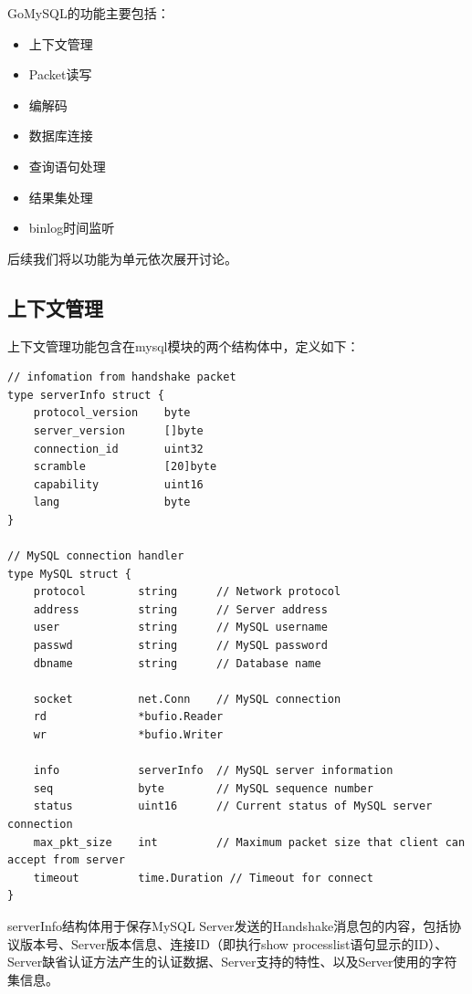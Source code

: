 \documentclass[a4paper, titlepage, 10pt, bookmark]{article}
\begin{document}
GoMySQL的功能主要包括：
\begin{itemize}
    \item 上下文管理
    \item Packet读写
    \item 编解码
    \item 数据库连接
    \item 查询语句处理
    \item 结果集处理
    \item binlog时间监听
\end{itemize}

后续我们将以功能为单元依次展开讨论。



\subsection{上下文管理}
上下文管理功能包含在mysql模块的两个结构体中，定义如下：
\begin{spacing}{1.0}
\begin{lstlisting}
// infomation from handshake packet
type serverInfo struct {
    protocol_version    byte  
    server_version      []byte 
    connection_id       uint32 
    scramble            [20]byte  
    capability          uint16      
    lang                byte     
}

// MySQL connection handler
type MySQL struct {
    protocol        string      // Network protocol
    address         string      // Server address
    user            string      // MySQL username
    passwd          string      // MySQL password
    dbname          string      // Database name

    socket          net.Conn    // MySQL connection
    rd              *bufio.Reader
    wr              *bufio.Writer

    info            serverInfo  // MySQL server information
    seq             byte        // MySQL sequence number
    status          uint16      // Current status of MySQL server connection
    max_pkt_size    int         // Maximum packet size that client can accept from server
    timeout         time.Duration // Timeout for connect
}
\end{lstlisting}
\end{spacing}

serverInfo结构体用于保存MySQL Server发送的Handshake消息包的内容，包括协议版本号、Server版本信息、连接ID（即执行show processlist语句显示的ID）、Server缺省认证方法产生的认证数据、Server支持的特性、以及Server使用的字符集信息。\\
\end{document}
